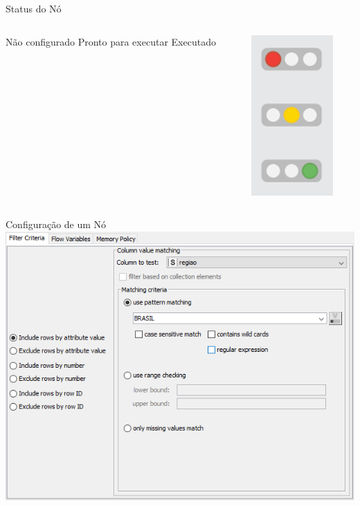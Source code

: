 \documentclass{beamer}
\begin{document}
\begin{frame}{Status do Nó}
    \begin{columns}
        \begin{column}{0.5\linewidth}
            \begin{outline}
                \1 Não configurado
                \1 Pronto para executar
                \1 Executado
            \end{outline}
        \end{column}
        \begin{column}{0.5\linewidth}
            \includegraphics[height=0.8\textheight]{Images/statusdono.png}
        \end{column}
    \end{columns}
\end{frame} 


\begin{frame}{Configuração de um Nó}
    \centering
   \includegraphics[width=0.8\linewidth]{Images/configuracaofiltro.png}
\end{frame} 
\end{document}

